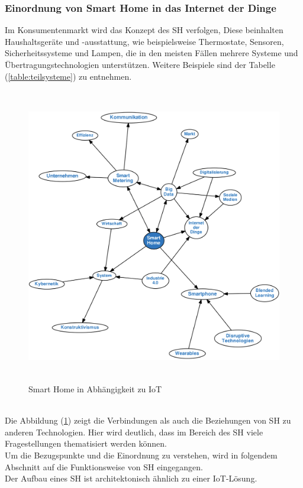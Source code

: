     \subsubsection*{Einordnung von Smart Home in das Internet der Dinge}
        Im Konsumentenmarkt wird %
        das Konzept des \acl{SH} verfolgen,  
        Diese beinhalten Haushaltsgeräte und -ausstattung, wie beispielsweise Thermostate, Sensoren, Sicherheitssysteme und Lampen, die in den meisten 
        Fällen mehrere Systeme und Übertragungstechnologien unterstützen. Weitere Beispiele sind der Tabelle (\ref{table:teilsysteme}) zu entnehmen. 
        \begin{figure}[hbt!]
            \centering
            \includegraphics[width=13cm,height=13cm,keepaspectratio]{images/smartHome_mindmap.png}
            \caption{Smart Home in Abhängigkeit zu IoT}
            \label{pic:mindmap_SH-IoT}
        \end{figure}
        \\
        \linebreak
        Die Abbildung (\ref{pic:mindmap_SH-IoT}) zeigt die Verbindungen als auch die Beziehungen von \acl{SH} zu anderen Technologien. Hier wird 
        deutlich, dass im Bereich des \acl{SH} viele Fragestellungen thematisiert werden können. 
        \\
        \linebreak
        Um die Bezugspunkte und die Einordnung zu verstehen, wird in folgendem Abschnitt auf die Funktionsweise von \acl{SH} eingegangen.
        \\ 
        Der Aufbau eines \acl{SH} ist architektonisch ähnlich zu einer \acs{IoT}-Lösung. 


